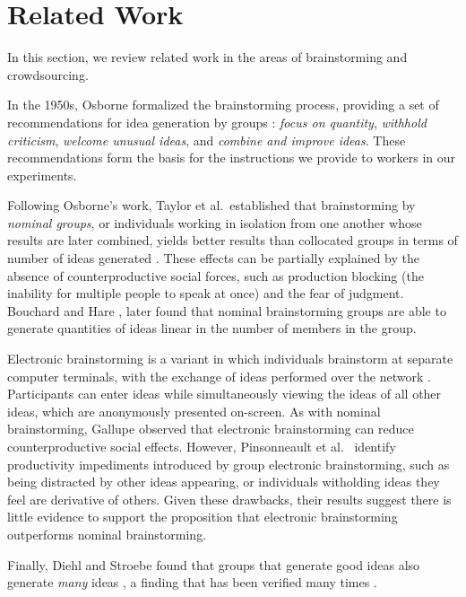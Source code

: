 \section{Related Work}
In this section, we review related work in the areas of brainstorming and crowdsourcing.

In the 1950s, Osborne formalized the brainstorming process, providing a set of recommendations for idea generation by groups \cite{osborn_applied_1957}: \emph{focus on quantity}, \emph{withhold criticism}, \emph{welcome unusual ideas}, and \emph{combine and improve ideas}. These recommendations form the basis for the instructions we provide to workers in our experiments.

Following Osborne's work, Taylor et al.\ established that brainstorming by \emph{nominal groups}, or individuals working in isolation from one another whose results are later combined, yields better results than collocated groups in terms of number of ideas generated \cite{taylor_does_1958}. These effects can be partially explained by the absence of counterproductive social forces, such as production blocking (the inability for multiple people to speak at once) and the fear of judgment. Bouchard and Hare \cite{bouchard_jr_size_1970}, later found that nominal brainstorming groups are able to generate quantities of ideas linear in the number of members in the group.

Electronic brainstorming is a variant in which individuals brainstorm at separate computer terminals, with the exchange of ideas performed over the network \cite{gallupe_electronic_1992}. Participants can enter ideas while simultaneously viewing the ideas of all other ideas, which are anonymously presented on-screen. As with nominal brainstorming, Gallupe \cite{gallupe_electronic_1992} observed that electronic brainstorming can reduce counterproductive social effects. However, Pinsonneault et al.\ \cite{pinsonneault_electronic_1999} identify productivity impediments introduced by group electronic brainstorming, such as being distracted by other ideas appearing, or individuals witholding ideas they feel are derivative of others. Given these drawbacks, their results suggest there is little evidence to support the proposition that electronic brainstorming outperforms nominal brainstorming.

Finally, Diehl and Stroebe found that groups that generate good ideas also generate \emph{many} ideas \cite{diehl_productivity_1987}, a finding that has been verified many times \cite{briggs1997quality, parnes1959effects, parnes_effects_1961, shah2003metrics, cross1996creativity}.

